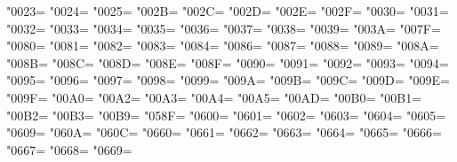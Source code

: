 \XeTeXcharclass"0023=\KclassNum
\XeTeXcharclass"0024=\KclassNum
\XeTeXcharclass"0025=\KclassNum
\XeTeXcharclass"002B=\KclassNum
\XeTeXcharclass"002C=\KclassNum
\XeTeXcharclass"002D=\KclassNum
\XeTeXcharclass"002E=\KclassNum
\XeTeXcharclass"002F=\KclassNum
\XeTeXcharclass"0030=\KclassNum
\XeTeXcharclass"0031=\KclassNum
\XeTeXcharclass"0032=\KclassNum
\XeTeXcharclass"0033=\KclassNum
\XeTeXcharclass"0034=\KclassNum
\XeTeXcharclass"0035=\KclassNum
\XeTeXcharclass"0036=\KclassNum
\XeTeXcharclass"0037=\KclassNum
\XeTeXcharclass"0038=\KclassNum
\XeTeXcharclass"0039=\KclassNum
\XeTeXcharclass"003A=\KclassNum
\XeTeXcharclass"007F=\KclassNum
\XeTeXcharclass"0080=\KclassNum
\XeTeXcharclass"0081=\KclassNum
\XeTeXcharclass"0082=\KclassNum
\XeTeXcharclass"0083=\KclassNum
\XeTeXcharclass"0084=\KclassNum
\XeTeXcharclass"0086=\KclassNum
\XeTeXcharclass"0087=\KclassNum
\XeTeXcharclass"0088=\KclassNum
\XeTeXcharclass"0089=\KclassNum
\XeTeXcharclass"008A=\KclassNum
\XeTeXcharclass"008B=\KclassNum
\XeTeXcharclass"008C=\KclassNum
\XeTeXcharclass"008D=\KclassNum
\XeTeXcharclass"008E=\KclassNum
\XeTeXcharclass"008F=\KclassNum
\XeTeXcharclass"0090=\KclassNum
\XeTeXcharclass"0091=\KclassNum
\XeTeXcharclass"0092=\KclassNum
\XeTeXcharclass"0093=\KclassNum
\XeTeXcharclass"0094=\KclassNum
\XeTeXcharclass"0095=\KclassNum
\XeTeXcharclass"0096=\KclassNum
\XeTeXcharclass"0097=\KclassNum
\XeTeXcharclass"0098=\KclassNum
\XeTeXcharclass"0099=\KclassNum
\XeTeXcharclass"009A=\KclassNum
\XeTeXcharclass"009B=\KclassNum
\XeTeXcharclass"009C=\KclassNum
\XeTeXcharclass"009D=\KclassNum
\XeTeXcharclass"009E=\KclassNum
\XeTeXcharclass"009F=\KclassNum
\XeTeXcharclass"00A0=\KclassNum
\XeTeXcharclass"00A2=\KclassNum
\XeTeXcharclass"00A3=\KclassNum
\XeTeXcharclass"00A4=\KclassNum
\XeTeXcharclass"00A5=\KclassNum
\XeTeXcharclass"00AD=\KclassNum
\XeTeXcharclass"00B0=\KclassNum
\XeTeXcharclass"00B1=\KclassNum
\XeTeXcharclass"00B2=\KclassNum
\XeTeXcharclass"00B3=\KclassNum
\XeTeXcharclass"00B9=\KclassNum
\XeTeXcharclass"058F=\KclassNum
\XeTeXcharclass"0600=\KclassNum
\XeTeXcharclass"0601=\KclassNum
\XeTeXcharclass"0602=\KclassNum
\XeTeXcharclass"0603=\KclassNum
\XeTeXcharclass"0604=\KclassNum
\XeTeXcharclass"0605=\KclassNum
\XeTeXcharclass"0609=\KclassNum
\XeTeXcharclass"060A=\KclassNum
\XeTeXcharclass"060C=\KclassNum
\XeTeXcharclass"0660=\KclassNum
\XeTeXcharclass"0661=\KclassNum
\XeTeXcharclass"0662=\KclassNum
\XeTeXcharclass"0663=\KclassNum
\XeTeXcharclass"0664=\KclassNum
\XeTeXcharclass"0665=\KclassNum
\XeTeXcharclass"0666=\KclassNum
\XeTeXcharclass"0667=\KclassNum
\XeTeXcharclass"0668=\KclassNum
\XeTeXcharclass"0669=\KclassNum
